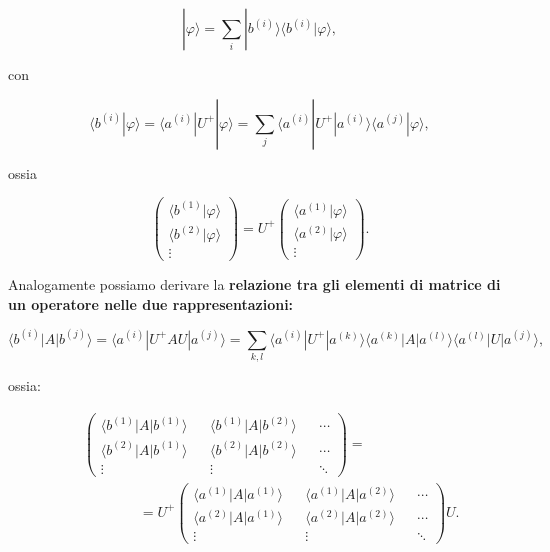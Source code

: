 \begin{equation}
| \varphi \rangle = \sum \limits_{i}  | b^{(i)} \rangle \langle b^{(i)} | \varphi \rangle ,
\end{equation}

con

\begin{equation}
\langle b^{(i)} | \varphi \rangle = \langle a^{(i)} |  U^+ | \varphi \rangle = \sum \limits_{j} \langle a^{(i)} | U^+ | a^{(i)}\rangle \langle a^{(j)} | \varphi \rangle ,
\end{equation}

ossia

\begin{equation}
\begin{pmatrix}
\langle b^{(1)} | \varphi \rangle \\
\langle b^{(2)} | \varphi \rangle \\
\vdots 
\end{pmatrix} = U^+
\begin{pmatrix}
\langle a^{(1)} | \varphi \rangle \\
\langle a^{(2)} | \varphi \rangle \\
\vdots 
\end{pmatrix} .
\end{equation}

Analogamente possiamo derivare  la \textbf{relazione tra gli elementi di matrice di un operatore nelle due rappresentazioni:}

\begin{equation}
\langle b^{(i)} | A | b^{(j)} \rangle = \langle a^{(i)} |  U^+AU | a^{(j)} \rangle = \sum \limits_{k,l} \langle a^{(i)} | U^+ |a^{(k)} \rangle \langle a^{(k)} | A | a^{(l)} \rangle \langle a^{(l)} | U  | a^{(j)} \rangle ,
\end{equation}

ossia:

\begin{eqnarray}
& &\begin{pmatrix}
\langle b^{(1)} | A | b^{(1)} \rangle  && \langle b^{(1)} | A | b^{(2)} \rangle && \cdots \\
\langle b^{(2)} | A | b^{(1)} \rangle && \langle b^{(2)} | A | b^{(2)} \rangle && \cdots \\
\vdots && \vdots && \ddots
\end{pmatrix} = \nonumber \\
& &\qquad\qquad = U^+
\begin{pmatrix}
\langle a^{(1)} | A | a^{(1)} \rangle && \langle a^{(1)} | A | a^{(2)} \rangle && \cdots \\
\langle a^{(2)} | A | a^{(1)} \rangle && \langle a^{(2)} | A | a^{(2)} \rangle && \cdots \\
\vdots && \vdots && \ddots
\end{pmatrix} U .
\end{eqnarray}

